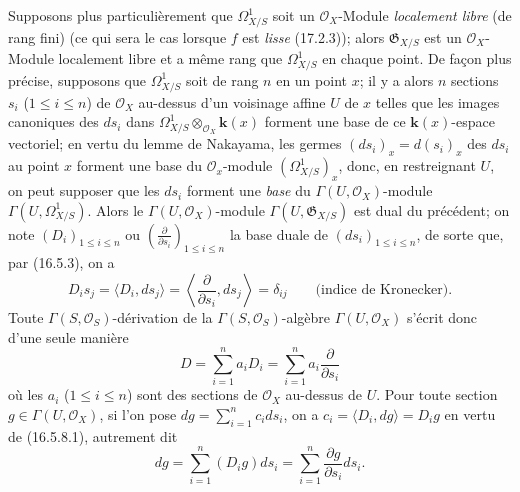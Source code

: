 \begin{env}[16.5.8]
\label{IV.16.5.8}
Supposons plus particulièrement que $\varOmega_{X/S}^1$ soit un
$\mathcal{O}_X$-Module \emph{localement libre} (de rang fini) (ce qui sera le
cas lorsque $f$ est \emph{lisse} (17.2.3)); alors $\mathfrak{G}_{X/S}$ est un
$\mathcal{O}_X$-Module localement libre et a même rang que $\varOmega_{X/S}^1$
en chaque point. De façon plus précise, supposons que $\varOmega_{X/S}^1$ soit de
rang $n$ en un point $x$; il y a alors $n$ sections $s_i$ ($1\leq i\leq n$)
de $\mathcal{O}_X$ au-dessus d'un voisinage affine $U$ de $x$ telles que les
images canoniques des $ds_i$ dans
$\varOmega_{X/S}^1\otimes_{\mathcal{O}_X}\boldsymbol{k}(x)$ forment une base de ce
$\boldsymbol{k}(x)$-espace vectoriel; en vertu du lemme de Nakayama, les germes
$(ds_i)_x=d(s_i)_x$ des $ds_i$ au point $x$ forment une base du
$\mathcal{O}_x$-module $(\varOmega_{X/S}^1)_x$, donc, en restreignant $U$, on
peut supposer que les $ds_i$ forment une \emph{base} du
$\Gamma(U,\mathcal{O}_X)$-module $\Gamma(U,\varOmega_{X/S}^1)$. Alors le
$\Gamma(U,\mathcal{O}_X)$-module $\Gamma(U,\mathfrak{G}_{X/S})$ est dual du
précédent; on note $(D_i)_{1\leq i\leq n}$ ou
$\left(\frac{\partial}{\partial s_i}\right)_{1\leq i\leq n}$ la base duale de
$(ds_i)_{1\leq i\leq n}$, de sorte que, par (16.5.3), on a
\[
  D_is_j=\langle D_i,ds_j\rangle
  =\left\langle\frac{\partial}{\partial s_i},ds_j\right\rangle
  =\delta_{ij}\qquad\text{(indice de Kronecker).}
  \tag{16.5.8.1}
  \label{IV.16.5.8.1}
\]
Toute $\Gamma(S,\mathcal{O}_S)$-dérivation de la
$\Gamma(S,\mathcal{O}_S)$-algèbre $\Gamma(U,\mathcal{O}_X)$ s'écrit donc
d'une seule manière
\[
  D=\sum_{i=1}^n a_iD_i=\sum_{i=1}^n a_i\frac{\partial}{\partial s_i}
\]
où les $a_i$ ($1\leq i\leq n$) sont des sections de $\mathcal{O}_X$ au-dessus
de $U$. Pour toute section $g\in\Gamma(U,\mathcal{O}_X)$, si l'on pose
$dg=\sum_{i=1}^n c_i ds_i$, on a
$c_i=\langle D_i,dg\rangle=D_ig$ en vertu de (16.5.8.1), autrement dit
\[
  dg=\sum_{i=1}^n(D_ig)ds_i
  =\sum_{i=1}^n\frac{\partial g}{\partial s_i}ds_i.
  \tag{16.5.8.2}
  \label{IV.16.5.8.2}
\]
\end{env}

